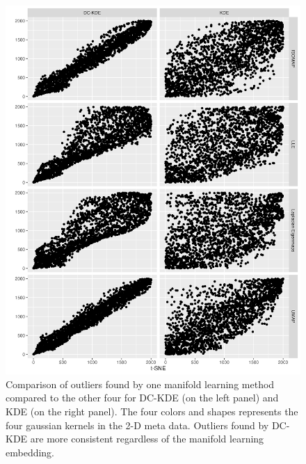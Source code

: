 \documentclass[11pt,a4paper,]{article}
\begin{document}
\begin{figure}

{\centering \includegraphics[width=0.95\linewidth]{figures/Twin Peak2000_density_compare_tsnevs4ml_radius8_r0_5_rank} 

}

\caption{Comparison of outliers found by one manifold learning method compared to the other four for DC-KDE (on the left panel) and KDE (on the right panel). The four colors and shapes represents the four gaussian kernels in the 2-D meta data. Outliers found by DC-KDE are more consistent regardless of the manifold learning embedding.}\label{fig:tpllevs4ml-3}
\end{figure}
\end{document}
